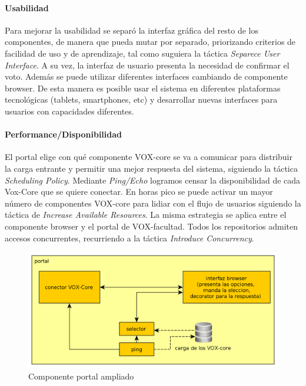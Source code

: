 \paragraph{Usabilidad}
Para mejorar la usabilidad se separó la interfaz gráfica del resto de los componentes, de manera que pueda mutar por separado, priorizando criterios de facilidad de uso y de aprendizaje, tal como suguiera la táctica \textit{Separece User Interface}. A su vez, la interfaz de usuario presenta la necesidad de confirmar el voto. Además se puede utilizar diferentes interfaces cambiando de componente browser. De esta manera es posible usar el sistema en diferentes plataformas tecnológicas (tablets, smartphones, etc) y desarrollar nuevas interfaces para usuarios con capacidades diferentes.

\paragraph{Performance/Disponibilidad}
El portal elige con qué componente VOX-core se va a comunicar para distribuir la carga entrante y permitir una mejor respuesta del sistema, siguiendo la táctica \textit{Scheduling Policy}. Mediante \textit{Ping/Echo} logramos censar la disponibilidad de cada Vox-Core que se quiere conectar. En horas pico se puede activar un mayor número de componentes VOX-core para lidiar con el flujo de usuarios siguiendo la táctica de \textit{Increase Available Resources}. La misma estrategia se aplica entre el componente browser y el portal de VOX-facultad.
Todos los repositorios admiten accesos concurrentes, recurriendo a la táctica \textit{Introduce Concurrency}.
\begin{figure}[H]
	\begin{center}
		\includegraphics[scale=0.22]{../diagramas/portal.png}
		\caption{Componente portal ampliado}
	\end{center} 
\end{figure}

